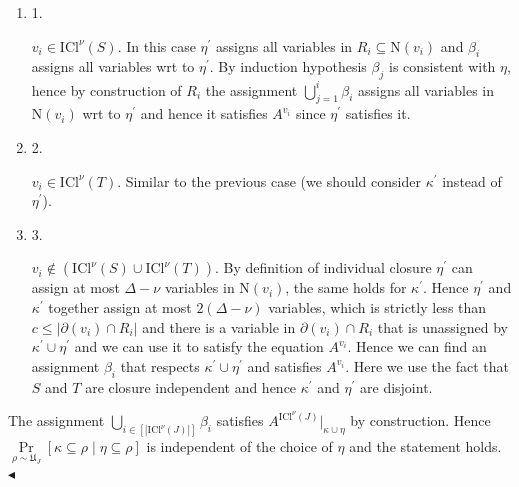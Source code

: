 \documentclass[10pt,a4paper]{article}
\begin{document}
\begin{enumerate}


\item[] 
1. 


$v_{i}\in\mathrm{ICl}^{\nu}\left(S\right)$. In this case $\eta^{\prime}$ assigns all variables in $R_{i}\subseteq\mathrm{N}\left(v_{i}\right)$ and $\beta_{i}$ assigns all variables wrt to $\eta^{\prime}$. By induction hypothesis
$\beta_{j}$ is consistent with $\eta$, hence by construction of $R_{i}$ the assignment
$\bigcup\limits_{j=1}^{i}\beta_{i}$ assigns all variables in $\mathrm{N}\left(v_{i}\right)$ wrt to $\eta^{\prime}$ and
hence it satisfies $A^{v_{i}}$ since $\eta^{\prime}$ satisfies it.\par





\item[] 
2. 


$v_{i}\in\mathrm{ICl}^{\nu}\left(T\right)$. Similar to the previous case (we should consider $\kappa^{\prime}$
instead of $\eta^{\prime}$).\par





\item[] 
3. 


$v_{i}\notin(\mathrm{ICl}^{\nu}\left(S\right)\cup\mathrm{ICl}^{\nu}\left(T%
\right))$. By definition of individual closure
$\eta^{\prime}$ can assign at most $\Delta-\nu$ variables in $\mathrm{N}\left(v_{i}\right)$, the same holds for
$\kappa^{\prime}$. Hence $\eta^{\prime}$ and $\kappa^{\prime}$ together assign at most $2(\Delta-\nu)$ variables,
which is strictly less than $c\leq|\partial(v_{i})\cap R_{i}|$ and there is a variable in $\partial(v_{i})\cap R_{i}$ that is unassigned
by $\kappa^{\prime}\cup\eta^{\prime}$ and we can use it to satisfy the equation $A^{v_{i}}$. Hence we can
find an assignment $\beta_{i}$ that respects $\kappa^{\prime}\cup\eta^{\prime}$ and satisfies $A^{v_{i}}$. Here
we use the fact that $S$ and $T$ are closure independent and hence $\kappa^{\prime}$ and $\eta^{\prime}$ are
disjoint.\par





\end{enumerate}


The assignment $\bigcup\limits_{i\in[|\mathrm{ICl}^{\nu}\left(J\right)|]}\beta_{i}$ satisfies
$A^{\mathrm{ICl}^{\nu}\left(J\right)}|_{\kappa\cup\eta}$ by construction. Hence
$\Pr\limits_{\rho\sim\mathfrak{U}_{J}}[\kappa\subseteq\rho\mid\eta\subseteq\rho]$ is independent of the choice of $\eta$ and the statement holds.
$\blacktriangleleft$\par
\end{document}
